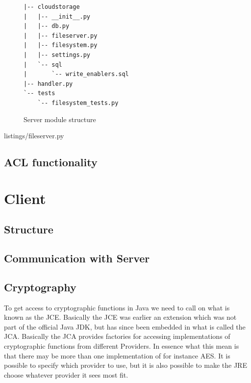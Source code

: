 \documentclass[pdftex,english,10pt,b5paper,twoside]{book}
\begin{document}
\begin{figure}[h!]
\begin{verbatim}
|-- cloudstorage
|   |-- __init__.py
|   |-- db.py
|   |-- fileserver.py
|   |-- filesystem.py
|   |-- settings.py
|   `-- sql
|       `-- write_enablers.sql
|-- handler.py
`-- tests
    `-- filesystem_tests.py
\end{verbatim}
    \caption{Server module structure}
    \label{fig:IM:layout}
\end{figure}


{listings/fileserver.py}

\subsection{ACL functionality}


\section{Client}
%

\subsection{Structure}

\subsection{Communication with Server}

\subsection{Cryptography}

To get access to cryptographic functions in Java we need to call on what is
known as the \ac{JCE}. Basically the \ac{JCE} was earlier an extension which
was not part of the official Java \ac{JDK}, but has since been embedded in what
is called the \ac{JCA}\cite{jca}.
Basically the \ac{JCA} provides factories for accessing implementations of
cryptographic functions from different Providers. In essence what this mean is
that there may be more than one implementation of for instance \ac{AES}. It is
possible to specify which provider to use, but it is also possible to make the
\ac{JRE} choose whatever provider it sees most fit. 
\end{document}
